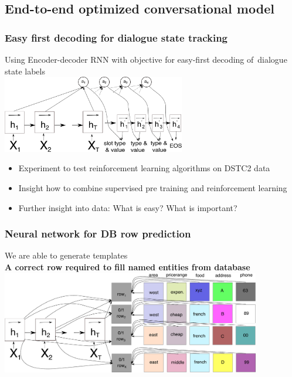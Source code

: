 \documentclass[10pt, compress,british,xcolor={svgnames,dvipsnames,x11names},trans]{beamer}
\begin{document}
\subsection{End-to-end optimized conversational model}  %

\begin{frame}\frametitle{Easy first decoding for dialogue state tracking}
    Using Encoder-decoder RNN with objective for easy-first decoding of~dialogue state labels  \\
    \includegraphics[width=0.6\textwidth]{encdec_easy}
    \begin{itemize}
        \item Experiment to test reinforcement learning algorithms on DSTC2 data
        \item Insight how to combine supervised pre training and reinforcement learning
        \item Further insight into data: What is easy? What is important?
    \end{itemize}
\end{frame}

\begin{frame}\frametitle{Neural network for DB row prediction}
    \begin{center}
    We are able to generate templates \\
    {\bf A correct row required to fill named entities from database}
        \vfill
    \includegraphics[width=0.85\textwidth]{./e2end_dbclassifiers}
    \end{center}
\end{frame}
\end{document}
